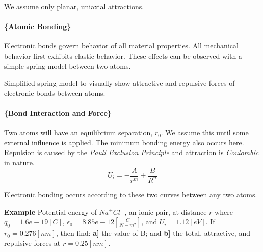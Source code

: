 \documentclass[
]{article}
\begin{document}
{We assume only planar, uniaxial attractions.}

\hypertarget{atomic-bonding}{%
\paragraph{\{Atomic Bonding\}}\label{atomic-bonding}}

Electronic bonds govern behavior of all material properties. All
mechanical behavior first exhibits elastic behavior. These effects can
be observed with a simple spring model between two atoms.

{Simplified spring model to visually show attractive and repulsive
forces of electronic bonds between atoms.}

\hypertarget{bond-interaction-and-force}{%
\paragraph{\{Bond Interaction and
Force\}}\label{bond-interaction-and-force}}

Two atoms will have an equilibrium separation, \(r_{0}\). We assume this
until some external influence is applied. The minimum bonding energy
also occurs here. Repulsion is caused by the
\textit{Pauli Exclusion Principle} and attraction is \textit{Coulombic}
in nature. \[U_{i} = -\frac{A}{r^{m}} + \frac{B}{R^{n}}\]

{Electronic bonding occurs according to these two curves between any two
atoms.}

\textbf{Example} Potential energy of \(Na^{+}Cl^{-}\), an ionic pair, at
distance \(r\) where \(q_{0} = 1.6e-19 [C]\),
\(\epsilon_{0} = 8.85e-12 [\frac{C}{N-m^{2}}]\), and
\(U_{i} = 1.12 [eV]\). If \(r_{0} = 0.276 [nm]\), then find: \textbf{a]}
the value of B; and \textbf{b]} the total, attractive, and repulsive
forces at \(r = 0.25 [nm]\).
\end{document}
